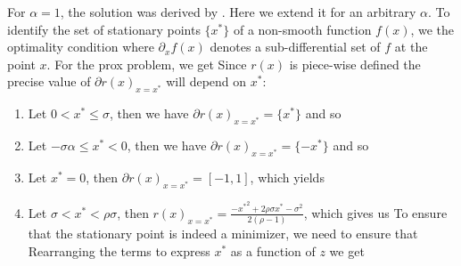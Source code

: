 For $\alpha = 1$, the solution was derived by \cite{fan1997comments}. 
Here we extend it  for an arbitrary $\alpha$. %
To identify the set of stationary points $\{x^*\}$ of a non-smooth function $f(x)$, we the optimality condition
where $\partial_x f(x)$ denotes a sub-differential set of $f$ at the point $x$. For the prox problem, we get %
Since $r(x)$ is piece-wise defined the precise value of $\partial r(x)_{x = x^*}$ will depend on $x^*$:
\begin{enumerate}
    \item Let $0 < x^* \leq \sigma$, then we have $\partial r(x)_{x = x^*} = \{x^*\}$ and so
    \item Let $-\sigma\alpha \leq x^* < 0$, then we have $\partial r(x)_{x = x^*} = \{-x^*\}$ and so
    \item Let $x^* = 0$, then $\partial r(x)_{x = x^*} = [-1, 1]$, which yields
    \item Let $\sigma < x^* < \rho\sigma$, then $r(x)_{x = x^*} = \frac{-{x^*}^2 + 2\rho\sigma x^* - \sigma^2}{2(\rho - 1)}$, which gives us 
    To ensure that the stationary point is indeed a minimizer, we need to ensure that 
Rearranging the terms to express $x^*$ as a function of $z$ we get %

\end{enumerate}
